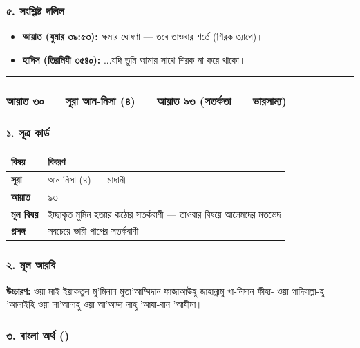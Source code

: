 \subsubsection*{৫. সংশ্লিষ্ট দলিল}

\begin{itemize}
\item \textbf{আয়াত (যুমার ৩৯:৫৩):} ক্ষমার ঘোষণা — তবে তাওবার শর্তে (শিরক ত্যাগে)।
\item \textbf{হাদিস (তিরমিযী ৩৫৪০):} ...যদি তুমি আমার সাথে শিরক না করে থাকো।
\end{itemize}
\medskip\hrule\medskip

\subsubsection*{আয়াত ৩০ — সূরা আন-নিসা (৪) — আয়াত ৯৩ (সতর্কতা — ভারসাম্য)}

\subsubsection*{১. সূত্র কার্ড}

\begin{table}[h]\centering\small
\begin{tabular}{ll}
বিষয় & বিবরণ \\
\hline
\textbf{সূরা} & আন-নিসা (৪) — মাদানী \\
\textbf{আয়াত} & ৯৩ \\
\textbf{মূল বিষয়} & ইচ্ছাকৃত মুমিন হত্যার কঠোর সতর্কবাণী — তাওবার বিষয়ে আলেমদের মতভেদ \\
\textbf{প্রসঙ্গ} & সবচেয়ে ভারী পাপের সতর্কবাণী \\
\hline
\end{tabular}
\end{table}

\subsubsection*{২. মূল আরবি}

\begin{center}\end{center}
\textbf{উচ্চারণ:} ওয়া মাই ইয়াকতুল মু'মিনান মুতা'আম্মিদান ফাজাআউহু জাহান্নামু খা-লিদান ফীহা- ওয়া গাদিবাল্লা-হু 'আলাইহি ওয়া লা'আনাহু ওয়া আ'আদ্দা লাহু 'আযা-বান 'আযীমা।

\subsubsection*{৩. বাংলা অর্থ ()}

